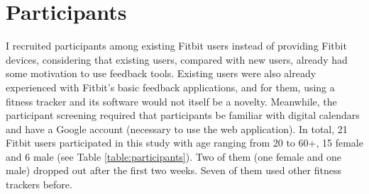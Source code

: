 \documentclass[12pt,oneside]{book}
\begin{document}
\section{Participants}
\label{field:screening}
I recruited participants among existing Fitbit users instead of providing Fitbit devices, considering that existing users, compared with new users, already had some motivation to use feedback tools. Existing users were also already experienced with Fitbit's basic feedback applications, and for them, using a fitness tracker and its software would not itself be a novelty. Meanwhile, the participant screening required that participants be familiar with digital calendars and have a Google account (necessary to use the web application). In total, 21 Fitbit users participated in this study with age ranging from 20 to 60+, 15 female and 6 male (see Table \ref{table:participants}). Two of them (one female and one male) dropped out after the first two weeks. Seven of them used other fitness trackers before.
\end{document}
